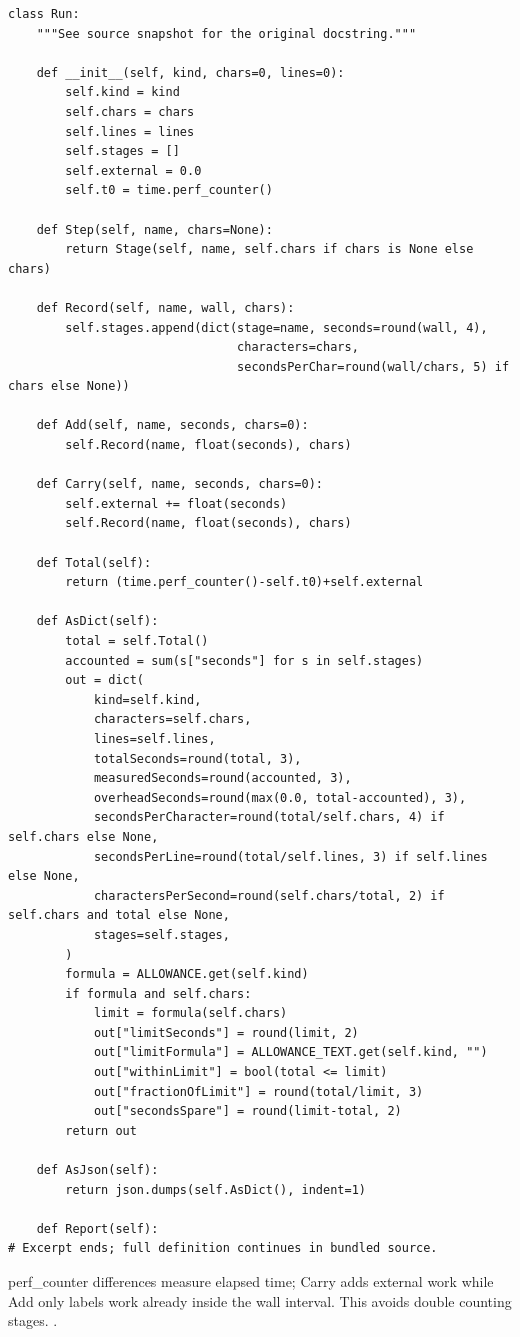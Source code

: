 \begin{lstlisting}[style=plain]
class Run:
    """See source snapshot for the original docstring."""

    def __init__(self, kind, chars=0, lines=0):
        self.kind = kind
        self.chars = chars
        self.lines = lines
        self.stages = []
        self.external = 0.0
        self.t0 = time.perf_counter()

    def Step(self, name, chars=None):
        return Stage(self, name, self.chars if chars is None else chars)

    def Record(self, name, wall, chars):
        self.stages.append(dict(stage=name, seconds=round(wall, 4),
                                characters=chars,
                                secondsPerChar=round(wall/chars, 5) if chars else None))

    def Add(self, name, seconds, chars=0):
        self.Record(name, float(seconds), chars)

    def Carry(self, name, seconds, chars=0):
        self.external += float(seconds)
        self.Record(name, float(seconds), chars)

    def Total(self):
        return (time.perf_counter()-self.t0)+self.external

    def AsDict(self):
        total = self.Total()
        accounted = sum(s["seconds"] for s in self.stages)
        out = dict(
            kind=self.kind,
            characters=self.chars,
            lines=self.lines,
            totalSeconds=round(total, 3),
            measuredSeconds=round(accounted, 3),
            overheadSeconds=round(max(0.0, total-accounted), 3),
            secondsPerCharacter=round(total/self.chars, 4) if self.chars else None,
            secondsPerLine=round(total/self.lines, 3) if self.lines else None,
            charactersPerSecond=round(self.chars/total, 2) if self.chars and total else None,
            stages=self.stages,
        )
        formula = ALLOWANCE.get(self.kind)
        if formula and self.chars:
            limit = formula(self.chars)
            out["limitSeconds"] = round(limit, 2)
            out["limitFormula"] = ALLOWANCE_TEXT.get(self.kind, "")
            out["withinLimit"] = bool(total <= limit)
            out["fractionOfLimit"] = round(total/limit, 3)
            out["secondsSpare"] = round(limit-total, 2)
        return out

    def AsJson(self):
        return json.dumps(self.AsDict(), indent=1)

    def Report(self):
# Excerpt ends; full definition continues in bundled source.
\end{lstlisting}
perf\_counter differences measure elapsed time; Carry adds external work while Add only labels work already inside the wall interval. This avoids double counting stages. \cite{pythontime,code2026}.


